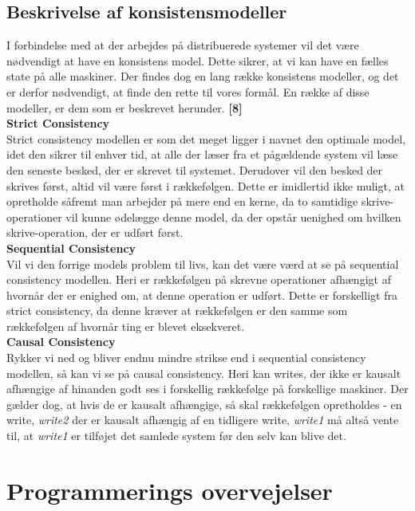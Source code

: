 \documentclass[a4paper,12pt]{article}
\begin{document}
\subsection{Beskrivelse af konsistensmodeller}
I forbindelse med at der arbejdes på distribuerede systemer vil det være nødvendigt at have en konsistens model. Dette sikrer, at vi kan have en fælles state på alle maskiner. 
Der findes dog en lang række konsistens modeller, og det er derfor nødvendigt, at finde den rette til vores formål. En række af disse modeller, er dem som er beskrevet herunder. \textbf{[8]}
\\[5px]
\textbf{Strict Consistency}
\\
Strict consistency modellen er som det meget ligger i navnet den optimale model, idet den sikrer til enhver tid, at alle der læser fra et pågældende system vil læse den seneste besked, der er skrevet til systemet. Derudover vil den besked der skrives først, altid vil være først i rækkefølgen. Dette er imidlertid ikke muligt, at opretholde såfremt man arbejder på mere end en kerne, da to samtidige skrive-operationer vil kunne ødelægge denne model, da der opstår uenighed om hvilken skrive-operation, der er udført først.
\\[5px]
\textbf{Sequential Consistency}
\\
Vil vi den forrige models problem til livs, kan det være værd at se på sequential consistency modellen. Heri er rækkefølgen på skrevne operationer afhængigt af hvornår der er enighed om, at denne operation er udført. Dette er forskelligt fra strict consistency, da denne kræver at rækkefølgen er den samme som rækkefølgen af hvornår ting er blevet eksekveret.
\\[5px]
\textbf{Causal Consistency}
\\
Rykker vi ned og bliver endnu mindre strikse end i sequential consistency modellen, så kan vi se på causal consistency. Heri kan writes, der ikke er kausalt afhængige af hinanden godt ses i forskellig rækkefølge på forskellige maskiner. Der gælder dog, at hvis de er kausalt afhængige, så skal rækkefølgen opretholdes - en write, \textit{write2} der er kausalt afhængig af en tidligere write, \textit{write1} må altså vente til, at \textit{write1} er tilføjet det samlede system før den selv kan blive det.
\newpage

\section{Programmerings overvejelser}
\end{document}
